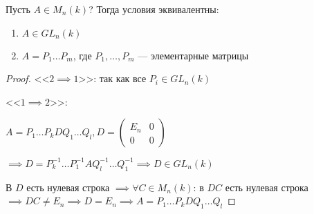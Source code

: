 \begin{follow}
    Пусть $A \in M_n(k)$? Тогда условия эквивалентны:

    \begin{enumerate}
        \item $A \in GL_n(k)$
        
        \item $A = P_1 \ldots P_m$, где $P_1, \ldots, P_m$ --- элементарные матрицы
    \end{enumerate}
\end{follow}

\begin{proof}
    <<$2 \implies 1$>>: так как все $P_i \in GL_n(k)$

    <<$1 \implies 2$>>: 

    $A = P_1 \ldots P_k D Q_1 \ldots Q_l, D = \begin{pmatrix}
        E_n & 0 \\
        0 & 0
    \end{pmatrix}$

    $\implies D = P_k^{-1} \ldots P_1^{-1} A Q_l^{-1} \ldots Q_1^{-1} \implies D \in GL_n(k)$

    В $D$ есть нулевая строка $\implies \forall C \in M_n(k)$: в $DC$ есть нулевая строка $\implies DC \neq E_n \implies D = E_n \implies A = P_1 \ldots P_k D Q_1 \ldots Q_l$
\end{proof}